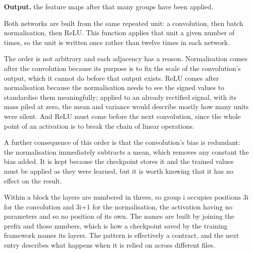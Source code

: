 \noindent\textbf{Output.} the feature maps after that many groups have been applied.


Both networks are built from the same repeated unit: a convolution, then batch normalisation, then ReLU. This function applies that unit a given number of times, so the unit is written once rather than twelve times in each network.


The order is not arbitrary and each adjacency has a reason. Normalisation comes after the convolution because its purpose is to fix the scale of the convolution's output, which it cannot do before that output exists. ReLU comes after normalisation because the normalisation needs to see the signed values to standardise them meaningfully; applied to an already rectified signal, with its mass piled at zero, the mean and variance would describe mostly how many units were silent. And ReLU must come before the next convolution, since the whole point of an activation is to break the chain of linear operations.

A further consequence of this order is that the convolution's bias is redundant: the normalisation immediately subtracts a mean, which removes any constant the bias added. It is kept because the checkpoint stores it and the trained values must be applied as they were learned, but it is worth knowing that it has no effect on the result.


Within a block the layers are numbered in threes, so group i occupies positions 3i for the convolution and 3i+1 for the normalisation, the activation having no parameters and so no position of its own. The names are built by joining the prefix and those numbers, which is how a checkpoint saved by the training framework names its layers. The pattern is effectively a contract, and the next entry describes what happens when it is relied on across different files.



